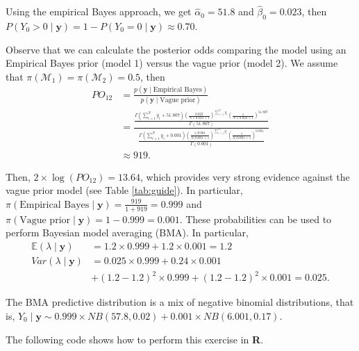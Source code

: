 Using the empirical Bayes approach, we get $\hat{\alpha}_0 = 51.8$ and $\hat{\beta}_0 = 0.023$, then $P(Y_0 > 0 \mid \mathbf{y}) = 1 - P(Y_0 = 0 \mid \mathbf{y}) \approx 0.70$.

Observe that we can calculate the posterior odds comparing the model using an Empirical Bayes prior (model 1) versus the vague prior (model 2). We assume that $\pi(\mathcal{M}_1) = \pi(\mathcal{M}_2) = 0.5$, then
\begin{align*}
	PO_{12}&=\frac{p(\mathbf{y}\mid \text{Empirical Bayes})}{p(\mathbf{y}\mid \text{Vague prior})}\\
	&=\frac{\frac{\Gamma(\sum_{i=1}^N y_i+51.807)\left(\frac{0.023}{N\times 0.023+1}\right)^{\sum_{i=1}^N y_i}\left(\frac{1}{N\times 0.023+1}\right)^{51.807}}{\Gamma(51.807)}}{\frac{\Gamma(\sum_{i=1}^N y_i+0.001)\left(\frac{1/0.001}{N/0.001+1}\right)^{\sum_{i=1}^N y_i}\left(\frac{1}{N/0.001+1}\right)^{0.001}}{\Gamma(0.001)}}\\
	&\approx 919.
\end{align*}

Then, $2 \times \log(PO_{12}) = 13.64$, which provides very strong evidence against the vague prior model (see Table \ref{tab:guide}). In particular, $\pi(\text{Empirical Bayes} \mid \mathbf{y}) = \frac{919}{1 + 919} = 0.999$ and $\pi(\text{Vague prior} \mid \mathbf{y}) = 1 - 0.999 = 0.001$. These probabilities can be used to perform Bayesian model averaging (BMA). In particular,
\begin{align*}
	\mathbb{E}(\lambda\mid \mathbf{y})&=1.2\times 0.999+1.2\times 0.001=1.2\\
	Var(\lambda\mid \mathbf{y})&=0.025\times 0.999+0.24\times 0.001\\
	& + (1.2-1.2)^2\times 0.999 + (1.2-1.2)^2\times 0.001= 0.025.
\end{align*}

The BMA predictive distribution is a mix of negative binomial distributions, that is, $Y_0\mid \mathbf{y}\sim 0.999\times NB(57.8, 0.02)+0.001\times NB(6.001, 0.17)$.

The following code shows how to perform this exercise in \textbf{R}.

